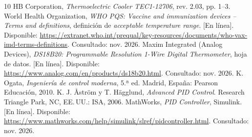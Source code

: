 \begin{thebibliography}{10}
 HB Corporation, \emph{Thermoelectric Cooler TEC1-12706}, rev. 2.03, pp. 1--3.
 World Health Organization, \emph{WHO PQS: Vaccine and immunization devices -- Terms and definitions}, definición de \emph{acceptable temperature range}. [En línea]. Disponible: \url{https://extranet.who.int/prequal/key-resources/documents/who-vax-imd-terms-definitions}. Consultado: nov. 2026.
 Maxim Integrated (Analog Devices), \emph{DS18B20: Programmable Resolution 1-Wire Digital Thermometer}, hoja de datos. [En línea]. Disponible: \url{https://www.analog.com/en/products/ds18b20.html}. Consultado: nov. 2026.
 K. Ogata, \emph{Ingeniería de control moderna}, 5.ª ed. Madrid, España: Pearson Educación, 2010.
 K. J. Åström y T. Hägglund, \emph{Advanced PID Control}. Research Triangle Park, NC, EE.\,UU.: ISA, 2006.
 MathWorks, \emph{PID Controller}, Simulink. [En línea]. Disponible: \url{https://www.mathworks.com/help/simulink/slref/pidcontroller.html}. Consultado: nov. 2026.

\end{thebibliography}
